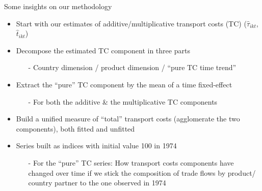 \documentclass[10 pt,Helvetica, french]{beamer}
\begin{document}
\begin{frame} [label = slide_compeffects_strategy]
Some insights on our methodology \hyperlink{app_compeffects_strategy}{} \vspace{0.1cm}
\begin{itemize}
\item Start with our estimates of additive/multiplicative transport costs (TC) ($\widehat{\tau}_{ikt}$, $\widehat{t}_{ikt}$)\vspace{0.1cm}
\pause
\item Decompose the estimated TC component in three parts \vspace{0.1cm}
\begin{itemize}
\item[-] Country dimension / product dimension / ``pure TC time trend'' \vspace{0.1cm}
\end{itemize}
\pause
\item Extract the ``pure'' TC component by the mean of a time fixed-effect \vspace{0.1cm}
\begin{itemize}
\item[-] For both the additive \& the multiplicative TC components \vspace{0.1cm}
\end{itemize}

\pause
\item Build a unified measure of ``total'' transport costs (agglomerate the two components), both fitted and unfitted \vspace{0.1cm}
\item Series built as indices with initial value 100 in 1974 \vspace{0.1cm}
\begin{itemize}
\item[-] For the ``pure'' TC series: How transport costs components have changed over time if we stick the composition of trade flows by product/ country partner to the one observed in 1974
\end{itemize}
\end{itemize}
\end{frame}
\end{document}
